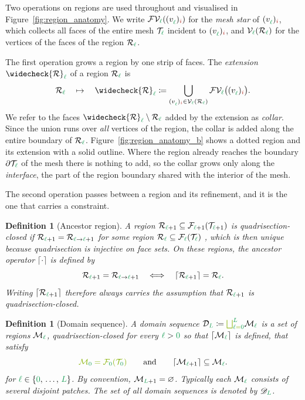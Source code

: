 \documentclass[a4paper, 12pt]{article}
\makeatletter
\newcommand{\guidance}[1]{{\color{lime!70!black} #1}}
\newcommand{\green}{\color{ForestGreen}}
\newcommand{\brickred}{\color{BrickRed}}
\newcommand{\T}{\mathcal{T}}
\newcommand{\V}{\mathcal{V}}
\newcommand{\F}{\mathcal{F}}
\newcommand{\vertex}[2]{\freeQ{v}{}{#1}{#2}}
\newcommand{\FVl}[1]{\F\V_{#1}}
\newcommand{\coarseIdxone}{{\brickred i}}
\renewcommand{\l}{{\green\ell}}
\renewcommand{\L}{{\green L}}
\newcommand{\lzero}{{\green 0}}
\newcommand{\R}{\mathcal{R}}
\newcommand{\freeQ}[4]{ ( {#1}^{#2}_{#3} )_{#4}}
\newcommand{\M}{\mathcal{M}}
\newtheorem{definition}[theorem]{Definition}
\theoremstyle{definition}
\theoremstyle{plain}
\numberwithin{equation}{section}
\newcommand{\extendedPatch}[1]{\widecheck{#1}}
\newcommand{\ancestorPatch}[1]{\lceil #1 \rceil}
\DeclareRobustCommand{\domseq}[1][]{\mathcal{D}\ifx\@empty#1\@empty\else_{#1}\fi}
\newcommand{\alldomseqs}{\mathscr{D}}
\newcommand{\boundary}{\partial}                            %
\makeatother
\begin{document}
Two operations on regions are used throughout and visualised in Figure~\ref{fig:region_anatomy}. We write $\FVl{\l}(\vertex{\l}{\coarseIdxone})$ for the \emph{mesh star} of $\vertex{\l}{\coarseIdxone}$, which collects all faces of the entire mesh $\T_\l$ incident to $\vertex{\l}{\coarseIdxone}$, and $\V_\l(\R_\l)$ for the vertices of the faces of the region $\R_\l$.

The first operation grows a region by one strip of faces. The \emph{extension} $\extendedPatch{\R}_\l$ of a region $\R_\l$ is
\begin{equation}
    \label{eq:patch_extension}
    \R_\l \quad \mapsto \quad \extendedPatch{\R}_\l
    \coloneq \bigcup\limits_{\vertex{\l}{\coarseIdxone} \in \V_\l(\R_\l)}
    \FVl{\l} \big(\vertex{\l}{\coarseIdxone} \big) .
\end{equation}
We refer to the faces $\extendedPatch{\R}_\l \setminus \R_\l$ added by the extension as \emph{collar}. Since the union runs over \emph{all} vertices of the region, the collar is added along the entire boundary of $\R_\l$. Figure~\ref{fig:region_anatomy_b} shows a dotted region and its extension with a solid outline. Where the region already reaches the boundary $\boundary \T_\l$ of the mesh there is nothing to add, so the collar grows only along the \emph{interface}, the part of the region boundary shared with the interior of the mesh.

The second operation passes between a region and its refinement, and it is the one that carries a constraint.

\begin{definition}[Ancestor region]
    \label{def:ancestor_patch}
    A region $\R_{\l+1} \subseteq \F_{\l+1}(\T_{\l+1})$ is \emph{quadrisection-closed} if $\R_{\l+1} = \R_{\l \to \l+1}$ for some region $\R_\l \subseteq \F_\l(\T_\l)$\guidance{, which is then unique because quadrisection is injective on face sets}. On these regions, the \emph{ancestor} operator $\ancestorPatch{\cdot}$ is defined by
    \begin{equation}
        \R_{\l+1} = \R_{\l \to \l+1} \quad \Longleftrightarrow \quad \ancestorPatch{\R_{\l+1}} = \R_{\l}.
    \end{equation}
    Writing $\ancestorPatch{\R_{\l+1}}$ therefore always carries the assumption that $\R_{\l+1}$ is quadrisection-closed.
\end{definition}

\begin{definition}[Domain sequence]
    \label{def:domseq}
    A domain sequence $\domseq[\L] \coloneq \guidance{\bigsqcup_{\l=\lzero}^{\L}} \M_\l$ is a set of regions $\M_\l$, \guidance{quadrisection-closed for every $\l > \lzero$ so that $\ancestorPatch{\M_\l}$ is defined,} that satisfy
    \begin{equation}
        \guidance{\M_\lzero = \F_\lzero(\T_\lzero)} \qquad \text{and} \qquad \ancestorPatch{\M_{\l+1}} \subseteq \M_\l.
    \end{equation}
    for $\l \in \{ \lzero, \, \dots, \, \L \}$. By convention, $\M_{\L+1} = \varnothing$. Typically each $\M_\l$ consists of several disjoint patches. The set of all domain sequences is denoted by $\alldomseqs_\L$.
\end{definition}
\end{document}
